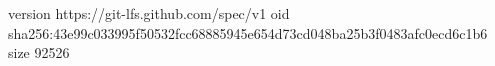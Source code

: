 version https://git-lfs.github.com/spec/v1
oid sha256:43e99c033995f50532fcc68885945e654d73cd048ba25b3f0483afc0ecd6c1b6
size 92526

